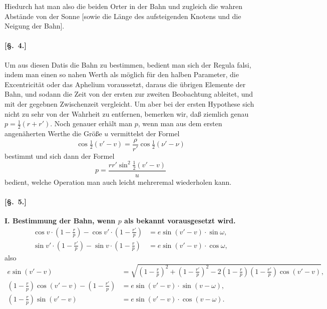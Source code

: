 \documentclass[12pt,a4paper]{article}
\theoremstyle{plain}
\theoremstyle{definition}
\theoremstyle{remark}
\begin{document}
Hiedurch hat man also die beiden Orter in der Bahn und zugleich die wahren Abstände von der Sonne [sowie die Länge des aufsteigenden Knotens und die Neigung der Bahn].

\newpage

\paragraph{[§.~4.]}

Um aus diesen Datis die Bahn zu bestimmen, bedient man sich der Regula falsi, indem man einen so nahen Werth als möglich für den halben Parameter, die Excentricität oder das Aphelium voraussetzt, daraus die übrigen Elemente der Bahn, und sodann die Zeit von der ersten zur zweiten Beobachtung ableitet, und mit der gegebnen Zwischenzeit vergleicht. Um aber bei der ersten Hypothese sich nicht zu sehr von der Wahrheit zu entfernen, bemerken wir, daß ziemlich genau $p = \frac{1}{2}(r + r')$. Noch genauer erhält man $p$, wenn man aus dem ersten angenäherten Werthe die Größe $u$ vermittelst der Formel
\[
\cos\tfrac{1}{2}(v' - v) = \frac{\rho}{r'} \cos\tfrac{1}{2}(\nu' - \nu)
\]
bestimmt und sich dann der Formel
\[
p = \frac{rr' \sin^2\tfrac{1}{2}(v' - v)}{u}
\]
bedient, welche Operation man auch leicht mehreremal wiederholen kann.

\newpage

\paragraph{[§.~5.]}

\textbf{I. Bestimmung der Bahn, wenn $p$ als bekannt vorausgesetzt wird.}
\begin{align*}
\cos v \cdot (1 - \tfrac{r}{p}) - \cos v' \cdot (1 - \tfrac{r'}{p}) &= e \sin(v' - v) \cdot \sin\omega, \\
\sin v' \cdot (1 - \tfrac{r'}{p}) - \sin v \cdot (1 - \tfrac{r}{p}) &= e \sin(v' - v) \cdot \cos\omega,
\end{align*}
also
\begin{align*}
e \sin(v' - v) &= \sqrt{(1 - \tfrac{r}{p})^2 + (1 - \tfrac{r'}{p})^2 - 2(1 - \tfrac{r}{p})(1 - \tfrac{r'}{p}) \cos(v' - v)}, \\
(1 - \tfrac{r}{p}) \cos(v' - v) - (1 - \tfrac{r'}{p}) &= e \sin(v' - v) \cdot \sin(v - \omega), \\
(1 - \tfrac{r}{p}) \sin(v' - v) &= e \sin(v' - v) \cdot \cos(v - \omega).
\end{align*}

\medskip
\end{document}
